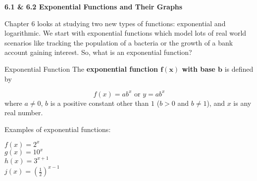 \documentclass[12pt]{book}
\begin{document}
\begin{comment}
Name: \underline{\hspace{100mm}}
\vspace{20mm}
  \centerline{\Large \textbf{Chapter 2: Equations and Inequalities} } 

{\large
\begin{center}
\begin{varwidth}{\textwidth}
\begin{enumerate}[2.1]
    \item The Regular Coordinate System and Graphs
    \item Linear Equations in One Variable
    \item Models and  Applications (Skipping)
    \item Complex Numbers
    \item Quadratic Equations
    \item Other Types of Equations
    \item Linear Inequalities and Absolute Value Inequalities
\end{enumerate}
\end{varwidth}
\end{center}

}
\newpage  
\end{comment}

{\Large \textbf{6.1 \& 6.2 Exponential Functions and Their Graphs}}
\vspace{3mm}

Chapter 6 looks at studying two new types of functions: exponential and logarithmic. We start with exponential functions which model lots of real world scenarios like tracking the population of a bacteria or the growth of a bank account gaining interest. So, what is an exponential function?
\vspace{3mm}

\begin{boxR}
    Exponential Function
    \vspace{1mm}
    \hline
    \vspace{2mm}
    The \textbf{exponential function $\mathbf{f(x)}$ with base $\mathbf{b}$} is defined by

    $$f(x)=ab^x \text{ or } y=ab^x$$
    where $a\neq0$, $b$ is a positive constant other than $1$ ($b >0$ and $b \neq 1$), and $x$ is any real number. 
\end{boxR}

Examples of exponential functions: 

\begin{multicols}{4}
    $f(x)=2^x$  \\ $g(x)=10^x$ \\ $h(x)=3^{x+1}$ \\ $j(x)=\left(\frac{1}{2}\right)^{x-1}$
\end{multicols}
\end{document}
